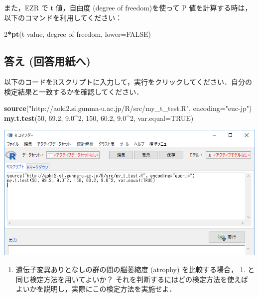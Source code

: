 \documentclass[11pt,]{problemset}
\newenvironment{Shaded}{\begin{snugshade}}{\end{snugshade}}
\newcommand{\DataTypeTok}[1]{\textcolor[rgb]{0.13,0.29,0.53}{#1}}
\newcommand{\DecValTok}[1]{\textcolor[rgb]{0.00,0.00,0.81}{#1}}
\newcommand{\FloatTok}[1]{\textcolor[rgb]{0.00,0.00,0.81}{#1}}
\newcommand{\KeywordTok}[1]{\textcolor[rgb]{0.13,0.29,0.53}{\textbf{#1}}}
\newcommand{\NormalTok}[1]{#1}
\newcommand{\OperatorTok}[1]{\textcolor[rgb]{0.81,0.36,0.00}{\textbf{#1}}}
\newcommand{\OtherTok}[1]{\textcolor[rgb]{0.56,0.35,0.01}{#1}}
\newcommand{\StringTok}[1]{\textcolor[rgb]{0.31,0.60,0.02}{#1}}
\providecommand{\tightlist}{%
  \setlength{\itemsep}{0pt}\setlength{\parskip}{0pt}}
\begin{document}
また，EZR で t 値，自由度 (degree of freedom)を使って P
値を計算する時は，以下のコマンドを利用してください：

\begin{Shaded}
\begin{Highlighting}[]
\DecValTok{2}\OperatorTok{*}\KeywordTok{pt}\NormalTok{(t value, degree of freedom, }\DataTypeTok{lower=}\OtherTok{FALSE}\NormalTok{)}
\end{Highlighting}
\end{Shaded}

\hypertarget{-}{%
\subsection{答え (回答用紙へ)}\label{-}}

以下のコードをRスクリプトに入力して，実行をクリックしてください．自分の検定結果と一致するかを確認してください．

\begin{Shaded}
\begin{Highlighting}[]
\KeywordTok{source}\NormalTok{(}\StringTok{"http://aoki2.si.gunma-u.ac.jp/R/src/my_t_test.R"}\NormalTok{, }\DataTypeTok{encoding=}\StringTok{"euc-jp"}\NormalTok{)}
\KeywordTok{my.t.test}\NormalTok{(}\DecValTok{50}\NormalTok{, }\FloatTok{69.2}\NormalTok{, }\FloatTok{9.0}\OperatorTok{^}\DecValTok{2}\NormalTok{, }\DecValTok{150}\NormalTok{, }\FloatTok{60.2}\NormalTok{, }\FloatTok{9.0}\OperatorTok{^}\DecValTok{2}\NormalTok{, }\DataTypeTok{var.equal=}\OtherTok{TRUE}\NormalTok{)}
\end{Highlighting}
\end{Shaded}

\begin{center}\includegraphics[width=0.9\linewidth]{pic/myttest01cut} \end{center}

\begin{enumerate}
\def\labelenumi{\arabic{enumi}.}
\setcounter{enumi}{1}
\tightlist
\item
  遺伝子変異ありとなしの群の間の脳萎縮度 (atrophy) を比較する場合， 1.
  と同じ検定方法を用いてよいか？
  それを判断するにはどの検定方法を使えばよいかを説明し，実際にこの検定方法を実施せよ．
\end{enumerate}
\end{document}
